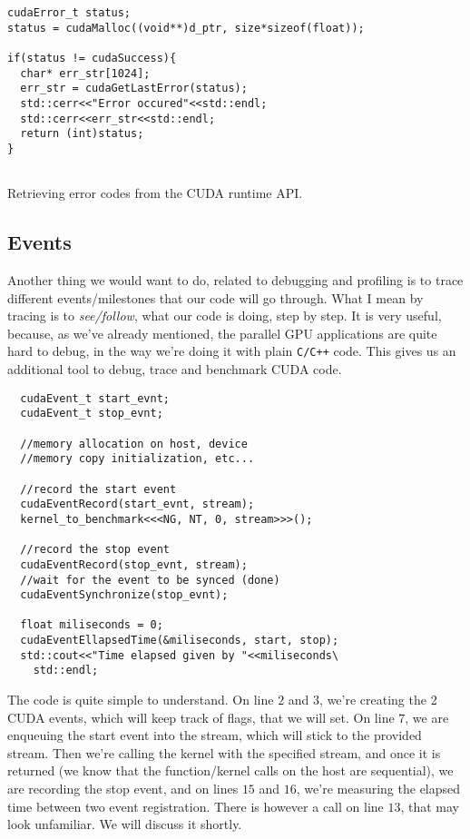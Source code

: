 \begin{listing}[ht!]
\begin{verbatim}
cudaError_t status;
status = cudaMalloc((void**)d_ptr, size*sizeof(float));

if(status != cudaSuccess){
  char* err_str[1024];
  err_str = cudaGetLastError(status);
  std::cerr<<"Error occured"<<std::endl;
  std::cerr<<err_str<<std::endl;
  return (int)status;
}
  
\end{verbatim}
\caption{Retrieving error codes from the CUDA runtime API.}
\label{listing:error}
\end{listing}


\subsection{Events}

Another thing we would want to do, related to debugging and profiling is to trace different events/milestones that our code 
will go through. What I mean by tracing is to \textit{see/follow}, what our code is doing, step by step. It is very useful, because, 
as we've already mentioned, the parallel GPU applications are quite hard to debug, in the way we're doing it with plain \verb|C/C++| code.
This gives us an additional tool to debug, trace and benchmark CUDA code.


\begin{listing}[ht!]
\begin{verbatim}
  cudaEvent_t start_evnt;
  cudaEvent_t stop_evnt;

  //memory allocation on host, device
  //memory copy initialization, etc...

  //record the start event 
  cudaEventRecord(start_evnt, stream);
  kernel_to_benchmark<<<NG, NT, 0, stream>>>();

  //record the stop event
  cudaEventRecord(stop_evnt, stream);
  //wait for the event to be synced (done)
  cudaEventSynchronize(stop_evnt);

  float miliseconds = 0;
  cudaEventEllapsedTime(&miliseconds, start, stop);
  std::cout<<"Time elapsed given by "<<miliseconds\
    std::endl;

\end{verbatim}
\caption{The code is quite simple to understand. On line $2$ and $3$, we're creating the 2 CUDA events,
which will keep track of flags, that we will set. On line $7$, we are enqueuing the start event into the stream, which will stick to the provided stream.
Then we're calling the kernel with the specified stream, and once it is returned (we know that the function/kernel calls on the host are sequential), we are recording 
the stop event, and on lines $15$ and $16$, we're measuring the elapsed time between two event registration. There is however a call on line $13$, that may look unfamiliar.
We will discuss it shortly.\cite{cuda_performance_metrics}}
\end{listing}

